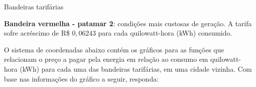 \begin{task}{Bandeiras tarifárias}
\begin{itemize}
\textbf{Bandeira vermelha - patamar 2}: condições mais custosas de geração. A tarifa sofre acréscimo de R\$ $0{,}06243$ para cada quilowatt-hora (kWh) consumido.
\end{itemize}


\justify
O sistema de coordenadas abaixo contém os gráficos para as funções que relacionam o preço a pagar pela energia em relação ao consumo em quilowatt-hora (kWh) para cada uma das bandeiras tarifárias, em uma cidade vizinha. Com base nas informações do gráfico a seguir, responda:

\begin{figure}[H]
\centering

\end{figure}

\end{task}

\know{}
\label{\detokenize{AF106-A::doc}}\label{\detokenize{AF106-A:para-saber-mais}}\label{\detokenize{AF106-A:sec-aprofundando-grafico}}

